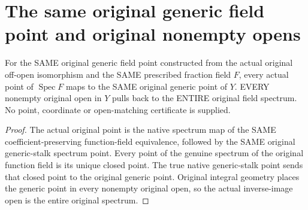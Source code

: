 \section{The same original generic field point and original nonempty opens}
\label{sec:generic-field-point-sections}

\begin{theorem}
\label{sc0-generic-field-sections:original-point-opens}
\leanok
For the SAME original generic field point constructed from the
actual original off-open isomorphism and the SAME prescribed
fraction field $F$, every actual point of $\operatorname{Spec}F$
maps to the SAME original generic point of $Y$. EVERY nonempty
original open in $Y$ pulls back to the ENTIRE original field spectrum.
No point, coordinate or open-matching certificate is supplied.
\end{theorem}
\begin{proof}
The actual original point is the native spectrum map of the
SAME coefficient-preserving function-field equivalence, followed
by the SAME original generic-stalk spectrum point. Every point
of the genuine spectrum of the original function field is its
unique closed point. The true native generic-stalk point sends
that closed point to the original generic point. Original integral
geometry places the generic point in every nonempty original open,
so the actual inverse-image open is the entire original spectrum.
\end{proof}

